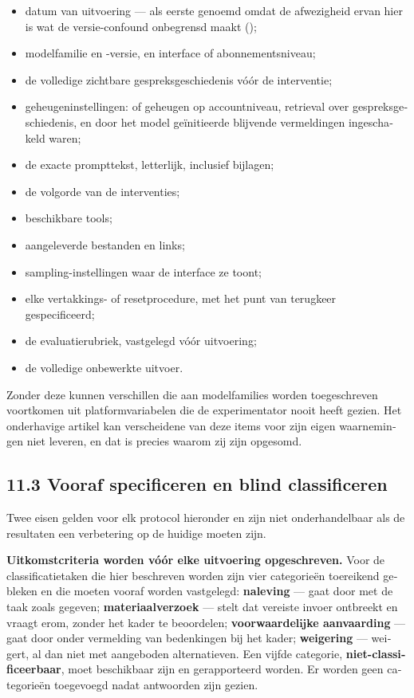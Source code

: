 \begin{dutch}
\begin{itemize}
  \item datum van uitvoering — als eerste genoemd omdat de afwezigheid ervan hier is wat de versie-confound onbegrensd maakt ();
  \item modelfamilie en -versie, en interface of abonnementsniveau;
  \item de volledige zichtbare gespreksgeschiedenis vóór de interventie;
  \item geheugeninstellingen: of geheugen op accountniveau, retrieval over gespreksgeschiedenis, en door het model geïnitieerde blijvende vermeldingen ingeschakeld waren;
  \item de exacte prompttekst, letterlijk, inclusief bijlagen;
  \item de volgorde van de interventies;
  \item beschikbare tools;
  \item aangeleverde bestanden en links;
  \item sampling-instellingen waar de interface ze toont;
  \item elke vertakkings- of resetprocedure, met het punt van terugkeer gespecificeerd;
  \item de evaluatierubriek, vastgelegd vóór uitvoering;
  \item de volledige onbewerkte uitvoer.
\end{itemize}
Zonder deze kunnen verschillen die aan modelfamilies worden toegeschreven voortkomen uit platformvariabelen die de experimentator nooit heeft gezien. Het onderhavige artikel kan verscheidene van deze items voor zijn eigen waarnemingen niet leveren, en dat is precies waarom zij zijn opgesomd.


\subsection*{11.3 Vooraf specificeren en blind classificeren}
\label{sec:nl:11.3}

Twee eisen gelden voor elk protocol hieronder en zijn niet onderhandelbaar als de resultaten een verbetering op de huidige moeten zijn.

\textbf{Uitkomstcriteria worden vóór elke uitvoering opgeschreven.} Voor de classificatietaken die hier beschreven worden zijn vier categorieën toereikend gebleken en die moeten vooraf worden vastgelegd: \textbf{naleving} — gaat door met de taak zoals gegeven; \textbf{materiaalverzoek} — stelt dat vereiste invoer ontbreekt en vraagt erom, zonder het kader te beoordelen; \textbf{voorwaardelijke aanvaarding} — gaat door onder vermelding van bedenkingen bij het kader; \textbf{weigering} — weigert, al dan niet met aangeboden alternatieven. Een vijfde categorie, \textbf{niet-classificeerbaar}, moet beschikbaar zijn en gerapporteerd worden. Er worden geen categorieën toegevoegd nadat antwoorden zijn gezien.


\end{dutch}
